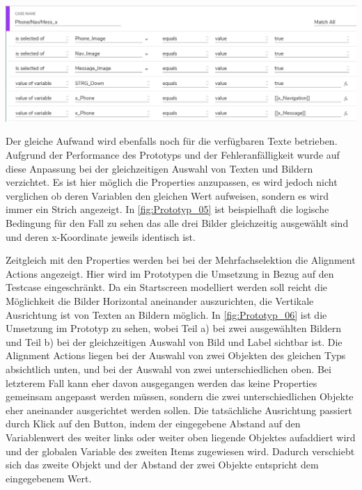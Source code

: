 \begin{center}
  \includegraphics[scale=0.6]{figures/Prototyp_05.PNG}
  \label{fig:Prototyp_05}
\end{center}

Der gleiche Aufwand wird ebenfalls noch für die verfügbaren Texte betrieben.
Aufgrund der Performance des Prototyps und der Fehleranfälligkeit wurde auf diese Anpassung bei der gleichzeitigen Auswahl von Texten und Bildern verzichtet.
Es ist hier möglich die Properties anzupassen, es wird jedoch nicht verglichen ob deren Variablen den gleichen Wert aufweisen, sondern es wird immer ein Strich angezeigt.
In \cref{fig:Prototyp_05} ist beispielhaft die logische Bedingung für den Fall zu sehen das alle drei Bilder gleichzeitig ausgewählt sind und deren x-Koordinate jeweils identisch ist.

Zeitgleich mit den Properties werden bei bei der Mehrfachselektion die Alignment Actions angezeigt.
Hier wird im Prototypen die Umsetzung in Bezug auf den Testcase eingeschränkt.
Da ein Startscreen modelliert werden soll reicht die Möglichkeit die Bilder Horizontal aneinander auszurichten, die Vertikale Ausrichtung ist von Texten an Bildern möglich.
In \cref{fig:Prototyp_06} ist die Umsetzung im Prototyp zu sehen, wobei Teil a) bei zwei ausgewählten Bildern und Teil b) bei der gleichzeitigen Auswahl von Bild und Label sichtbar ist.
Die Alignment Actions liegen bei der Auswahl von zwei Objekten des gleichen Typs absichtlich unten, und bei der Auswahl von zwei unterschiedlichen oben.
Bei letzterem Fall kann eher davon ausgegangen werden das keine Properties gemeinsam angepasst werden müssen, sondern die zwei unterschiedlichen Objekte eher aneinander ausgerichtet werden sollen.
Die tatsächliche Ausrichtung passiert durch Klick auf den Button, indem der eingegebene Abstand auf den Variablenwert des weiter links oder weiter oben liegende Objektes aufaddiert wird und der globalen Variable des zweiten Items zugewiesen wird.
Dadurch verschiebt sich das zweite Objekt und der Abstand der zwei Objekte entspricht dem eingegebenem Wert.

